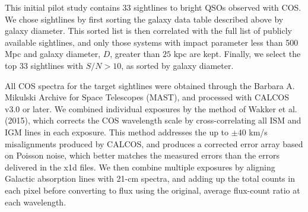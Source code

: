 \documentclass[iop]{emulateapj-rtx4}
\begin{document}
This initial pilot study contains 33 sightlines to bright QSOs observed with COS. We chose sightlines by first sorting the galaxy data table described above by galaxy diameter. This sorted list is then correlated with the full list of publicly available sightlines, and only those systems with impact parameter less than 500 Mpc and galaxy diameter, $D$, greater than $25$ kpc  are kept. Finally, we select the top 33 sightlines with $S/N > 10$, as sorted by galaxy diameter.


All COS spectra for the target sightlines were obtained through the Barbara A. Mikulski Archive for Space Telescopes (MAST), and processed with CALCOS v3.0 or later. We combined individual exposures by the method of Wakker et al. (2015), which corrects the COS wavelength scale by cross-correlating all ISM and IGM lines in each exposure. This method addresses the up to $\pm40$ km/s misalignments produced by CALCOS, and produces a corrected error array based on Poisson noise, which better matches the measured errors than the errors delivered in the x1d files. We then combine multiple exposures by aligning Galactic absorption lines with 21-cm spectra, and adding up the total counts in each pixel before converting to flux using the original, average flux-count ratio at each wavelength.
\end{document}

